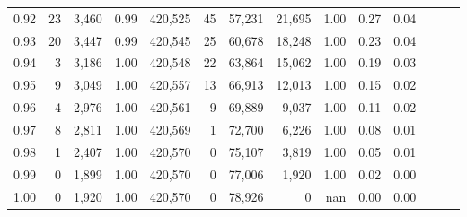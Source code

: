 \begin{tabular}{rrrrrrrrrrrrrr}
0.92 &     23 &  3,460 &  0.99 &  420,525 &       45 &  57,231 &  21,695 &  1.00 &  0.27 &      0.04 \\
0.93 &     20 &  3,447 &  0.99 &  420,545 &       25 &  60,678 &  18,248 &  1.00 &  0.23 &      0.04 \\
0.94 &      3 &  3,186 &  1.00 &  420,548 &       22 &  63,864 &  15,062 &  1.00 &  0.19 &      0.03 \\
0.95 &      9 &  3,049 &  1.00 &  420,557 &       13 &  66,913 &  12,013 &  1.00 &  0.15 &      0.02 \\
0.96 &      4 &  2,976 &  1.00 &  420,561 &        9 &  69,889 &   9,037 &  1.00 &  0.11 &      0.02 \\
0.97 &      8 &  2,811 &  1.00 &  420,569 &        1 &  72,700 &   6,226 &  1.00 &  0.08 &      0.01 \\
0.98 &      1 &  2,407 &  1.00 &  420,570 &        0 &  75,107 &   3,819 &  1.00 &  0.05 &      0.01 \\
0.99 &      0 &  1,899 &  1.00 &  420,570 &        0 &  77,006 &   1,920 &  1.00 &  0.02 &      0.00 \\
1.00 &      0 &  1,920 &  1.00 &  420,570 &        0 &  78,926 &       0 &   nan &  0.00 &      0.00 \\
\bottomrule
\end{tabular}
